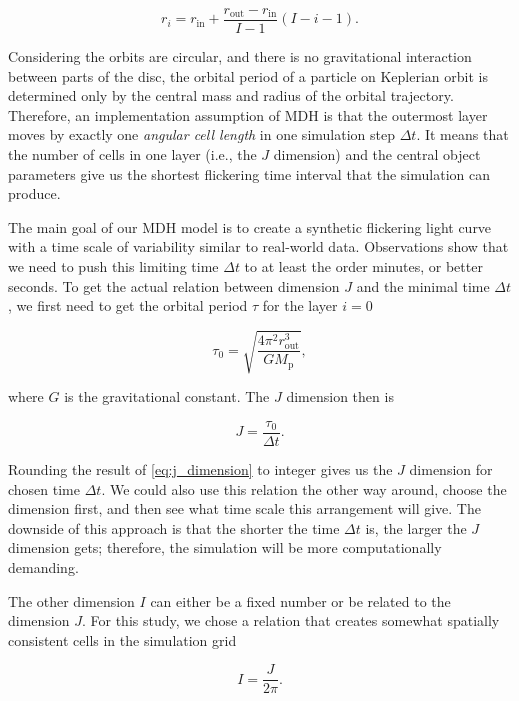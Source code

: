 \begin{equation}
    r_i = r_{\text{in}} + \frac{r_{\text{out}} - r_{\text{in}}}{I - 1} (I - i - 1).
\end{equation}

Considering the orbits are circular, and there is no gravitational interaction between parts of the disc, the orbital period of a particle on Keplerian orbit is determined only by the central mass and radius of the orbital trajectory. Therefore, an implementation assumption of MDH is that the outermost layer moves by exactly one \emph{angular cell length} in one simulation step $\Delta t$. It means that the number of cells in one layer (i.e., the $J$ dimension) and the central object parameters give us the shortest flickering time interval that the simulation can produce.

The main goal of our MDH model is to create a synthetic flickering light curve with a time scale of variability similar to real-world data. Observations show that we need to push this limiting time $\Delta t$ to at least the order minutes, or better seconds. To get the actual relation between dimension $J$ and the minimal time $\Delta t$, we first need to get the orbital period $\tau$ for the layer $i=0$

\begin{equation}
    \tau_{0} = \sqrt{\frac{4 \pi^2 r_{\text{out}}^3}{G M_{\text{p}}}},
    \label{eq:outer_layer_tau}
\end{equation}

where $G$ is the gravitational constant. The $J$ dimension then is

\begin{equation}
	J = \frac{\tau_{0}}{\Delta t}.
	\label{eq:j_dimension}
\end{equation}

Rounding the result of \eqref{eq:j_dimension} to integer gives us the $J$ dimension for chosen time $\Delta t$. We could also use this relation the other way around, choose the dimension first, and then see what time scale this arrangement will give. The downside of this approach is that the shorter the time $\Delta t$ is, the larger the $J$ dimension gets; therefore, the simulation will be more computationally demanding.

The other dimension $I$ can either be a fixed number or be related to the dimension $J$. For this study, we chose a relation that creates somewhat spatially consistent cells in the simulation grid

\begin{equation}
	I = \frac{J}{2 \pi}.
	\label{eq:i_dimension} 
\end{equation}

